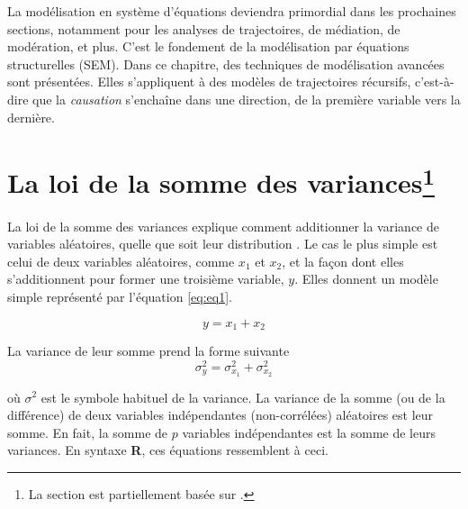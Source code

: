 \documentclass[
]{book}
\begin{document}
La modélisation en système d'équations deviendra primordial dans les prochaines sections, notamment pour les analyses de trajectoires, de médiation, de modération, et plus. C'est le fondement de la modélisation par équations structurelles (SEM).
Dans ce chapitre, des techniques de modélisation avancées sont présentées. Elles s'appliquent à des modèles de trajectoires récursifs, c'est-à-dire que la \emph{causation} s'enchaîne dans une direction, de la première variable vers la dernière.

\hypertarget{la-loi-de-la-somme-des-variances}{%
\section[La loi de la somme des variances]{\texorpdfstring{La loi de la somme des variances\footnote{La section est partiellement basée sur \textcite{Caron21}.}}{La loi de la somme des variances}}\label{la-loi-de-la-somme-des-variances}}

La loi de la somme des variances explique comment additionner la variance de variables aléatoires, quelle que soit leur distribution \autocite{casella2002}. Le cas le plus simple est celui de deux variables aléatoires, comme \(x_1\) et \(x_2\), et la façon dont elles s'additionnent pour former une troisième variable, \(y\). Elles donnent un modèle simple représenté par l'équation \eqref{eq:eq1}.

\begin{equation}
y=x_1+x_2
\label{eq:eq1}
\end{equation}

La variance de leur somme prend la forme suivante
\begin{equation}
\sigma_y^2=\sigma_{x_1}^2+\sigma_{x_2}^2
\label{eq:eq2}
\end{equation}

où \(\sigma^2\) est le symbole habituel de la variance. La variance de la somme (ou de la différence) de deux variables indépendantes (non-corrélées) aléatoires est leur somme. En fait, la somme de \(p\) variables indépendantes est la somme de leurs variances. En syntaxe \textbf{R}, ces équations ressemblent à ceci.
\end{document}
